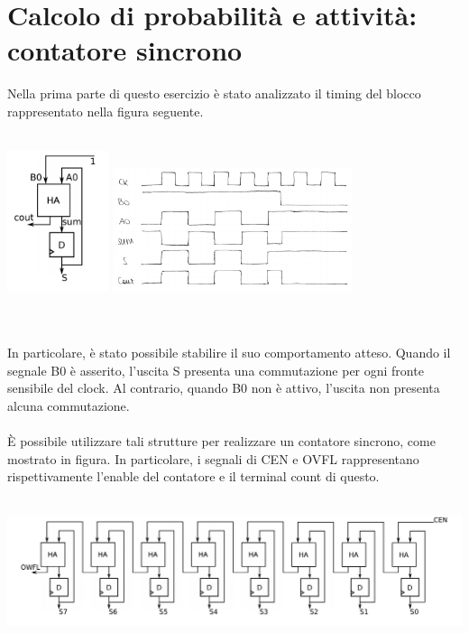 \documentclass[11pt,  english, makeidx, a4paper, titlepage, oneside]{book}
\begin{document}
\section{Calcolo di probabilità e attività: contatore sincrono}
Nella prima parte di questo esercizio è stato analizzato il timing del blocco 
rappresentato nella figura seguente.
\\\\
\centerline{\includegraphics[width=3cm]{./img/Lab_1/Es_5/Sync_FA.png}
			\includegraphics[width=7cm]{./img/Lab_1/Es_5/Half_add_contatore.png}}
\\\\
In particolare, è stato possibile stabilire il suo comportamento atteso. 
Quando il segnale B0 è asserito, l'uscita S presenta una commutazione 
per ogni fronte sensibile del clock. Al contrario, quando B0 non è attivo, 
l'uscita non presenta alcuna commutazione.
\\\\
È possibile utilizzare tali strutture per realizzare un contatore sincrono,
come mostrato in figura. In particolare, i segnali di CEN e OVFL rappresentano
rispettivamente l'enable del contatore e il terminal count di questo.
\\\\
\centerline{\includegraphics[width=15cm]{./img/Lab_1/Es_5/Counter.png}}
\\\\
\end{document}
